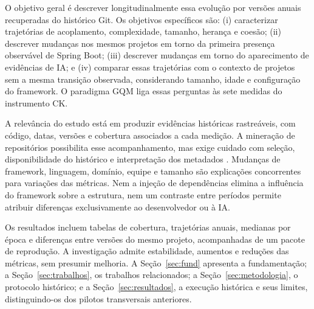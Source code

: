 O objetivo geral é descrever longitudinalmente essa evolução por versões anuais recuperadas do histórico Git. Os objetivos específicos são: (i) caracterizar trajetórias de acoplamento, complexidade, tamanho, herança e coesão; (ii) descrever mudanças nos mesmos projetos em torno da primeira presença observável de Spring Boot; (iii) descrever mudanças em torno do aparecimento de evidências de IA; e (iv) comparar essas trajetórias com o contexto de projetos sem a mesma transição observada, considerando tamanho, idade e configuração do framework. O paradigma GQM liga essas perguntas às sete medidas do instrumento CK.

A relevância do estudo está em produzir evidências históricas rastreáveis, com código, datas, versões e cobertura associados a cada medição. A mineração de repositórios possibilita esse acompanhamento, mas exige cuidado com seleção, disponibilidade do histórico e interpretação dos metadados \cite{hassan:08,kalliamvakou:16}. Mudanças de framework, linguagem, domínio, equipe e tamanho são explicações concorrentes para variações das métricas. Nem a injeção de dependências elimina a influência do framework sobre a estrutura, nem um contraste entre períodos permite atribuir diferenças exclusivamente ao desenvolvedor ou à IA.

Os resultados incluem tabelas de cobertura, trajetórias anuais, medianas por época e diferenças entre versões do mesmo projeto, acompanhadas de um pacote de reprodução. A investigação admite estabilidade, aumentos e reduções das métricas, sem presumir melhoria. A Seção~\ref{sec:fund} apresenta a fundamentação; a Seção~\ref{sec:trabalhos}, os trabalhos relacionados; a Seção~\ref{sec:metodologia}, o protocolo histórico; e a Seção~\ref{sec:resultados}, a execução histórica e seus limites, distinguindo-os dos pilotos transversais anteriores.
